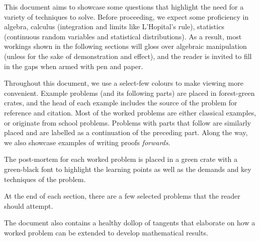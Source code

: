 \documentclass[../jarvis.tex]{subfiles}
\begin{document}
This document aims to showcase some questions that highlight the need for a variety of techniques to solve. Before proceeding, we expect some proficiency in algebra, calculus (integration and limits like L'Hopital's rule), statistics (continuous random variables and statistical distributions). As a result, most workings shown in the following sections will gloss over algebraic manipulation (unless for the sake of demonstration and effect), and the reader is invited to fill in the gaps when armed with pen and paper.

Throughout this document, we use a select-few colours to make viewing more convenient. Example problems (and its following parts) are placed in forest-green crates, and the head of each example includes the source of the problem for reference and citation. Most of the worked problems are either classical examples, or originate from school problems. Problems with parts that follow are similarly placed and are labelled as a continuation of the preceding part. Along the way, we also showcase examples of writing proofs \textit{forwards}.

The post-mortem for each worked problem is placed in a green crate with a green-black font to highlight the learning points as well as the demands and key techniques of the problem.

At the end of each section, there are a few selected problems that the reader should attempt.

The document also contains a healthy dollop of tangents that elaborate on how a worked problem can be extended to develop mathematical results.
\end{document}
